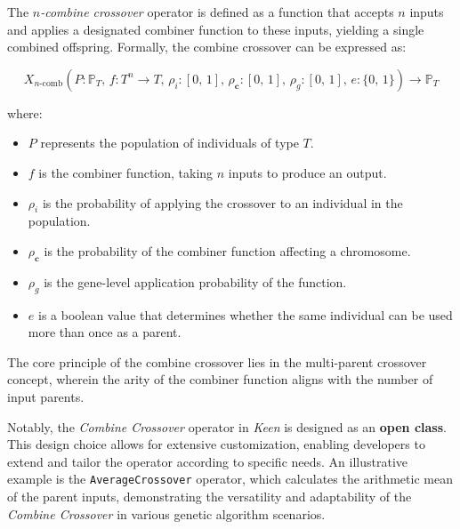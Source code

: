 \begin{definition}
    The \textit{\(n\)-combine crossover} operator is defined as a function that accepts \(n\) inputs and applies a 
    designated combiner function to these inputs, yielding a single combined offspring. Formally, the combine 
    crossover can be expressed as:

    \begin{equation}
        X_{n\text{-comb}}(P: \mathbb{P}_T,\, f: T^n \rightarrow T,\, \rho_i: [0,\, 1],\, \rho_\mathbf{c}: [0,\, 1],\, 
            \rho_g: [0,\, 1],\, e: \{0,\, 1\})\to \mathbb{P}_T
    \end{equation}

    where:

    \begin{itemize}
        \item \(P\) represents the population of individuals of type \(T\).
        \item \(f\) is the combiner function, taking \(n\) inputs to produce an output.
        \item \(\rho_i\) is the probability of applying the crossover to an individual in the population.
        \item \(\rho_\mathbf{c}\) is the probability of the combiner function affecting a chromosome.
        \item \(\rho_g\) is the gene-level application probability of the function.
        \item \(e\) is a boolean value that determines whether the same individual can be used more than once as a 
            parent.
    \end{itemize}
\end{definition}

\begin{remark}
    The core principle of the combine crossover lies in the multi-parent crossover concept, wherein the arity of the 
    combiner function aligns with the number of input parents.
\end{remark}

Notably, the \textit{Combine Crossover} operator in \textit{Keen} is designed as an \textbf{open class}. This design 
choice allows for extensive customization, enabling developers to extend and tailor the operator according to 
specific needs. An illustrative example is the \texttt{AverageCrossover} operator, which calculates the arithmetic 
mean of the parent inputs, demonstrating the versatility and adaptability of the \textit{Combine Crossover} in 
various genetic algorithm scenarios.
